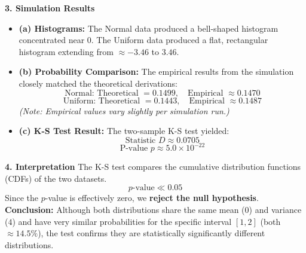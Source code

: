 \documentclass{article}
\begin{document}
\textbf{3. Simulation Results}
\begin{itemize}
	\item \textbf{(a) Histograms:}
	      The Normal data produced a bell-shaped histogram concentrated near 0. The Uniform data produced a flat, rectangular histogram extending from $\approx -3.46$ to $3.46$.

	\item \textbf{(b) Probability Comparison:}
	      The empirical results from the simulation closely matched the theoretical derivations:
	      \[ \text{Normal: Theoretical } = 0.1499, \quad \text{Empirical } \approx 0.1470 \]
	      \[ \text{Uniform: Theoretical } = 0.1443, \quad \text{Empirical } \approx 0.1487 \]
	      \textit{(Note: Empirical values vary slightly per simulation run.)}

	\item \textbf{(c) K-S Test Result:}
	      The two-sample K-S test yielded:
	      \[ \text{Statistic } D \approx 0.0705 \]
	      \[ \text{P-value } p \approx 5.0 \times 10^{-22} \]
\end{itemize}

\textbf{4. Interpretation}
The K-S test compares the cumulative distribution functions (CDFs) of the two datasets.
\[ p \text{-value} \ll 0.05 \]
Since the $p$-value is effectively zero, we \textbf{reject the null hypothesis}. \textbf{Conclusion:} Although both
distributions share the same mean ($0$) and variance ($4$) and have very similar probabilities for the specific
interval $[1, 2]$ (both $\approx 14.5\%$), the test confirms they are statistically significantly different
distributions.
\end{document}
